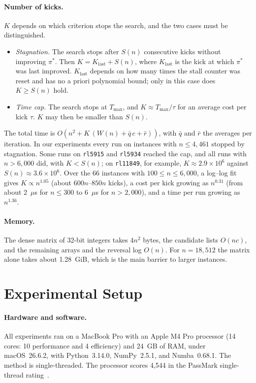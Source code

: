\documentclass[runningheads]{llncs}
\begin{document}
\paragraph{Number of kicks.} $K$ depends on which criterion stops the
search, and the two cases must be distinguished.
\begin{itemize}
  \item \emph{Stagnation.} The search stops after $S(n)$ consecutive
    kicks without improving $\pi^*$. Then $K=K_{\mathrm{last}}+S(n)$,
    where $K_{\mathrm{last}}$ is the kick at which $\pi^*$ was last
    improved. $K_{\mathrm{last}}$ depends on how many times the stall
    counter was reset and has no a priori polynomial bound; only in this
    case does $K\ge S(n)$ hold.
  \item \emph{Time cap.} The search stops at $T_{\max}$, and
    $K\approx T_{\max}/\tau$ for an average cost per kick $\tau$. $K$
    may then be smaller than $S(n)$.
\end{itemize}
The total time is $O(n^2+K\,(W(n)+\bar q\,c+\bar r))$, with $\bar q$
and $\bar r$ the averages per iteration. In our experiments every run on
instances with $n\le 4{,}461$ stopped by stagnation. Some runs on
\texttt{rl5915} and \texttt{rl5934} reached the cap, and all runs with
$n>6{,}000$ did, with $K<S(n)$; on \texttt{rl11849}, for example,
$K\approx 2.9\times10^6$ against $S(n)\approx 3.6\times10^6$. Over the
66 instances with $100\le n\le 6{,}000$, a log--log fit gives
$K\propto n^{1.05}$ (about $600n$--$850n$ kicks), a cost per kick
growing as $n^{0.31}$ (from about 2~$\mu$s for $n\le 300$ to 6~$\mu$s for
$n>2{,}000$), and a time per run growing as $n^{1.36}$.

\paragraph{Memory.} The dense matrix of 32-bit integers takes $4n^2$
bytes, the candidate lists $O(nc)$, and the remaining arrays and the
reversal log $O(n)$. For $n=18{,}512$ the matrix alone takes about
1.28~GiB, which is the main barrier to larger instances.

\section{Experimental Setup}
\label{sec:setup}

\paragraph{Hardware and software.}
All experiments ran on a MacBook Pro with an Apple M4 Pro processor
(14 cores: 10 performance and 4 efficiency) and 24~GB of RAM, under
macOS~26.6.2, with Python~3.14.0, NumPy~2.5.1, and Numba~0.68.1. The
method is single-threaded. The processor scores 4{,}544 in the
PassMark single-thread rating~\cite{passmark_m4pro}.
\end{document}
